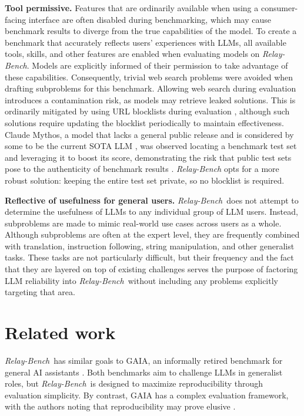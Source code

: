 \documentclass[10pt,letterpaper,twocolumn]{article}
\newcommand{\relaybench}{\texorpdfstring{{\textit{Relay-Bench}}}{Relay-Bench}}
\begin{document}
\textbf{Tool permissive.} Features that are ordinarily available when using a consumer-facing interface are often disabled during benchmarking, which may cause benchmark results to diverge from the true capabilities of the model. To create a benchmark that accurately reflects users' experiences with LLMs, all available tools, skills, and other features are enabled when evaluating models on \relaybench{}. Models are explicitly informed of their permission to take advantage of these capabilities. Consequently, trivial web search problems were avoided when drafting subproblems for this benchmark. Allowing web search during evaluation introduces a contamination risk, as models may retrieve leaked solutions.
This is ordinarily mitigated by using URL blocklists during evaluation \cite[p.~244]{mythos-card}, although such solutions require updating the blocklist periodically to maintain effectiveness.
Claude Mythos, a model that lacks a general public release and is considered by some to be the current SOTA LLM \cite{anthropic-glasswing,claudefast-mythos}, was observed locating a benchmark test set and leveraging it to boost its score, demonstrating the risk that public test sets pose to the authenticity of benchmark results \cite[p.~36]{mythos-card}.
\relaybench{} opts for a more robust solution: keeping the entire test set private, so no blocklist is required.

\textbf{Reflective of usefulness for general users.} \relaybench\ does not attempt to determine the usefulness of LLMs to any individual group of LLM users. Instead, subproblems are made to mimic real-world use cases across users as a whole. Although subproblems are often at the expert level, they are frequently combined with translation, instruction following, string manipulation, and other generalist tasks. These tasks are not particularly difficult, but their frequency and the fact that they are layered on top of existing challenges serves the purpose of factoring LLM reliability into \relaybench\ without including any problems explicitly targeting that area.

\section{Related work}

\relaybench\ has similar goals to GAIA, an informally retired benchmark for general AI assistants \cite{gaia-paper}. Both benchmarks aim to challenge LLMs in generalist roles, but \relaybench\ is designed to maximize reproducibility through evaluation simplicity. By contrast, GAIA has a complex evaluation framework, with the authors noting that reproducibility may prove elusive \cite{gaia-paper}.
\end{document}
